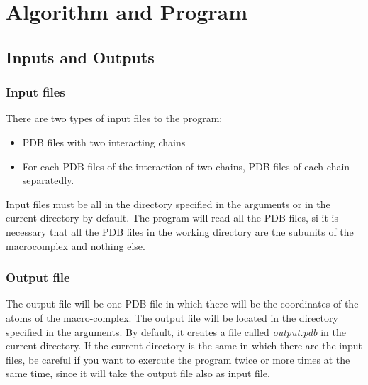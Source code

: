 \documentclass[a4paper,12pt]{report}
\begin{document}




\chapter{Algorithm and Program}


\section{Inputs and Outputs}

\subsection{Input files}

There are two types of input files to the program:

\begin{itemize}
 \item PDB files with two interacting chains
 \item For each PDB files of the interaction of two chains, PDB files of each chain separatedly.
\end{itemize}

Input files must be all in the directory specified in the arguments or in the current directory by default. The program will read all the PDB files, si it is necessary that all the PDB files in the working directory are the subunits of the macrocomplex and nothing else.

\subsection{Output file}

The output file will be one PDB file in which there will be the coordinates of the atoms of the macro-complex. The output file will be located in the directory specified in the arguments. By default, it creates a file called \textit{output.pdb} in the current directory. If the current directory is the same in which there are the input files, be careful if you want to exercute the program twice or more times at the same time, since it will take the output file also as input file.
\end{document}
